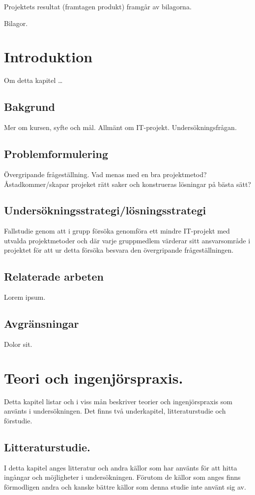 \documentclass[conference]{IEEEtran}
\begin{document}
Projektets resultat (framtagen produkt) framgår av bilagorna.

Bilagor.


\section{Introduktion}
Om detta kapitel \dots

\subsection{Bakgrund}
Mer om kursen, syfte och mål. Allmänt om IT-projekt. Undersökningsfrågan.

\subsection{Problemformulering}
Övergripande frågeställning.
Vad menas med en bra projektmetod? Åstadkommer/skapar projeket rätt saker och konstrueras
lösningar på bästa sätt?

\subsection{Undersökningsstrategi/lösningsstrategi}
Fallstudie genom att i grupp försöka genomföra ett mindre IT-projekt med utvalda projektmetoder
och där varje gruppmedlem värderar sitt ansvarsområde i projektet för att ur detta försöka
besvara den övergripande frågeställningen.

\subsection{Relaterade arbeten}
Lorem ipsum.

\subsection{Avgränsningar}
Dolor sit.

\section{Teori och ingenjörspraxis.}
Detta kapitel listar och i viss mån beskriver teorier och ingenjörspraxis som använts
i undersökningen. Det finns två underkapitel, litteraturstudie och förstudie.

\subsection{Litteraturstudie.}
I detta kapitel anges litteratur och andra källor som har använts för att hitta ingångar
och möjligheter i undersökningen. Förutom de källor som anges finns förmodligen andra 
och kanske bättre källor som denna studie inte använt sig av.
\end{document}
